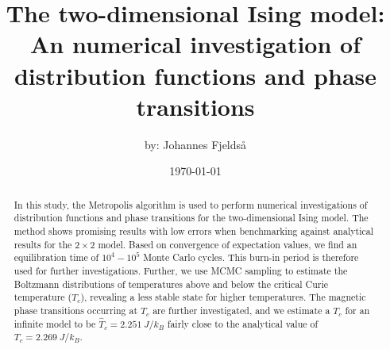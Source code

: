 \documentclass[english,notitlepage,reprint,nofootinbib]{revtex4-2}  %
\begin{document}
\title{
The two-dimensional Ising model:\\
An numerical investigation of distribution functions and phase transitions
}      %
\author{by: Johannes Fjeldså}          %
\date{\today}                             %
\noaffiliation                            %

\begin{abstract}
    \noindent In this study, the Metropolis algorithm is used to perform numerical investigations of distribution functions and phase transitions for the two-dimensional Ising model. The method shows promising results with low errors when benchmarking against analytical results for the $2\times 2$ model. Based on convergence of expectation values, we find an equilibration time of $10^{4}-10^{5}$ Monte Carlo cycles. This burn-in period is therefore used for further investigations. Further, we use MCMC sampling to estimate the Boltzmann distributions of temperatures above and below the critical Curie temperature ($T_c$), revealing a less stable state for higher temperatures. The magnetic phase transitions occurring at $T_c$ are further investigated, and we estimate a $T_c$ for an infinite model to be $\hat{T}_c=2.251~J/k_B$ fairly close to the analytical value of $T_c=2.269~J/k_B$.
\end{abstract}
\maketitle























\newpage
\onecolumngrid
% 



\newpage

\end{document}
